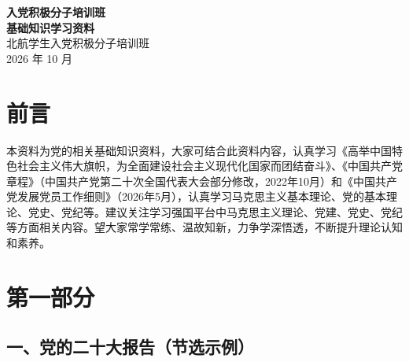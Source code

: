\documentclass[UTF8,11pt,a4paper]{ctexart}
\begin{document}
\begin{titlepage}
\centering
\vspace*{5cm}
{\Huge\bfseries 入党积极分子培训班}\\[0.8em]
{\Huge\bfseries 基础知识学习资料}\\[2.5em]
{\large 北航学生入党积极分子培训班}\\[1em]
{\large 2026 年 10 月}
\vfill
\end{titlepage}

\section*{前言}

本资料为党的相关基础知识资料，大家可结合此资料内容，认真学习《高举中国特色社会主义伟大旗帜，为全面建设社会主义现代化国家而团结奋斗》、《中国共产党章程》（中国共产党第二十次全国代表大会部分修改，2022年10月）和《中国共产党发展党员工作细则》（2026年5月），认真学习马克思主义基本理论、党的基本理论、党史、党纪等。建议关注学习强国平台中马克思主义理论、党建、党史、党纪等方面相关内容。望大家常学常练、温故知新，力争学深悟透，不断提升理论认知和素养。

\section*{第一部分}

\subsection*{一、党的二十大报告（节选示例）}
\end{document}
